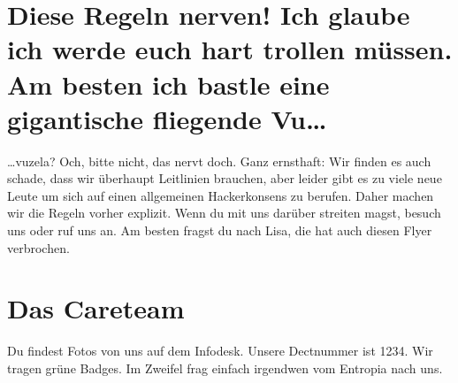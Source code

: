 \documentclass[10pt,foldmark]{leaflet}
\begin{document}
\section{Diese Regeln nerven! Ich glaube ich werde euch hart trollen müssen. Am besten ich bastle eine gigantische fliegende Vu\ldots}
\label{sec-8}
\ldots vuzela? Och, bitte nicht, das nervt doch. Ganz ernsthaft: Wir
finden es auch schade, dass wir überhaupt Leitlinien brauchen, aber
leider gibt es zu viele neue Leute um sich auf einen allgemeinen
Hackerkonsens zu berufen. Daher machen wir die Regeln vorher
explizit. Wenn du mit uns darüber streiten magst, besuch uns oder ruf
uns an. Am besten fragst du nach Lisa, die hat auch diesen Flyer
verbrochen.

\section{Das Careteam}
Du findest Fotos von uns auf dem Infodesk. Unsere Dectnummer ist
1234. Wir tragen grüne Badges. Im Zweifel frag einfach irgendwen vom
Entropia nach uns.
\end{document}
